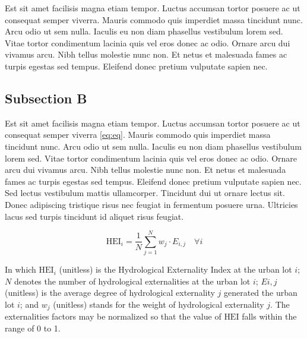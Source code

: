 \documentclass[11pt]{article}
\begin{document}
\par Est sit amet facilisis magna etiam tempor. Luctus accumsan tortor posuere ac ut consequat semper viverra. Mauris commodo quis imperdiet massa tincidunt nunc. Arcu odio ut sem nulla. Iaculis eu non diam phasellus vestibulum lorem sed. Vitae tortor condimentum lacinia quis vel eros donec ac odio. Ornare arcu dui vivamus arcu. Nibh tellus molestie nunc non. Et netus et malesuada fames ac turpis egestas sed tempus. Eleifend donec pretium vulputate sapien nec.

\subsection{Subsection B} \label{sec:subb}

\par Est sit amet facilisis magna etiam tempor. Luctus accumsan tortor posuere ac ut consequat semper viverra \eqref{eq:eq}. Mauris commodo quis imperdiet massa tincidunt nunc. Arcu odio ut sem nulla. Iaculis eu non diam phasellus vestibulum lorem sed. Vitae tortor condimentum lacinia quis vel eros donec ac odio. Ornare arcu dui vivamus arcu. Nibh tellus molestie nunc non. Et netus et malesuada fames ac turpis egestas sed tempus. Eleifend donec pretium vulputate sapien nec. Sed lectus vestibulum mattis ullamcorper. Tincidunt dui ut ornare lectus sit. Donec adipiscing tristique risus nec feugiat in fermentum posuere urna. Ultricies lacus sed turpis tincidunt id aliquet risus feugiat.
\begin{linenomath*}
\begin{equation}
	\label{eq:eq}
	\text{HEI}_{i} =  \frac{1}{N} \sum_{j=1}^{N} w_{j} \cdot E_{i, j} \quad \forall i 
\end{equation}
\end{linenomath*}
In which $\text{HEI}_{i}$ (unitless) is the Hydrological Externality Index at the urban lot $i$; $N$ denotes the number of hydrological externalities at the urban lot $i$; $E{i,j}$ (unitless) is the average degree of hydrological externality $j$ generated the urban lot $i$; and $w_{j}$ (unitless) stands for the weight of hydrological externality $j$. The externalities factors may be normalized so that the value of $\text{HEI}$ falls within the range of 0 to 1.
\end{document}
